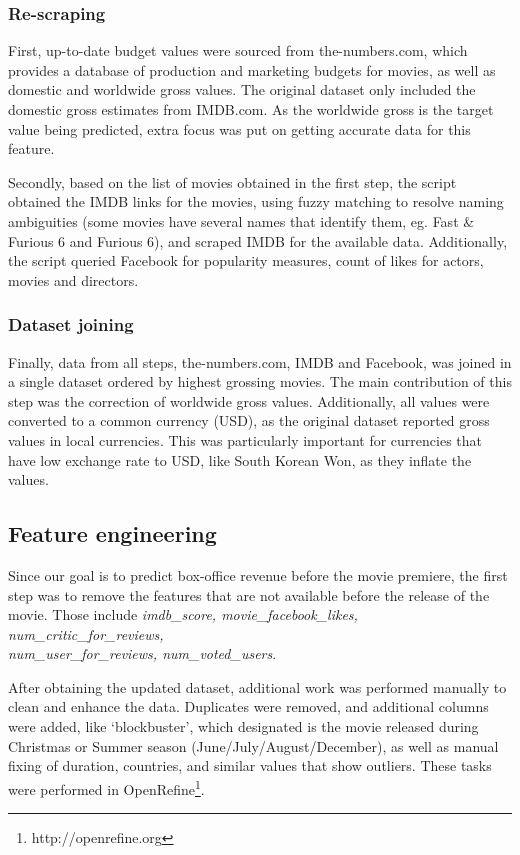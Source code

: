 \subsubsection{Re-scraping}
First, up-to-date budget values were sourced from the-numbers.com, which provides a database of production and marketing budgets for movies, as well as domestic and worldwide gross values. The original dataset only included the domestic gross estimates from IMDB.com. As the worldwide gross is the target value  being predicted, extra focus was put on getting accurate data for this feature.

Secondly, based on the list of movies obtained in the first step, the script obtained the IMDB links for the movies, using fuzzy matching  to resolve naming ambiguities (some movies have several names that identify them, eg. Fast \& Furious 6 and Furious 6), and scraped IMDB for the available data. Additionally, the script queried Facebook for popularity measures, count of likes for actors, movies and directors.

\subsubsection{Dataset joining}
Finally, data from all steps, the-numbers.com, IMDB and Facebook, was joined in a single dataset ordered by highest grossing movies. The main contribution of this step was the correction of worldwide gross values. Additionally, all values were converted to a common currency (USD), as the original dataset reported gross values in local currencies. This was particularly important for currencies that have low exchange rate to USD, like South Korean Won, as they inflate the values.

\subsection{Feature engineering}
Since our goal is to predict box-office revenue before the movie premiere, the first step was to remove the features that are not available before the release of the movie. Those include \textit{imdb\_score, movie\_facebook\_likes, num\_critic\_for\_reviews, \\num\_user\_for\_reviews, num\_voted\_users}.

After obtaining the updated dataset, additional work was performed manually to clean and enhance the data. Duplicates were removed, and additional columns were added, like ‘blockbuster’, which designated is the movie released during Christmas or Summer season (June/July/August/December), as well as manual fixing of duration, countries, and similar values that show outliers. These tasks were performed in OpenRefine\footnote{http://openrefine.org}.

